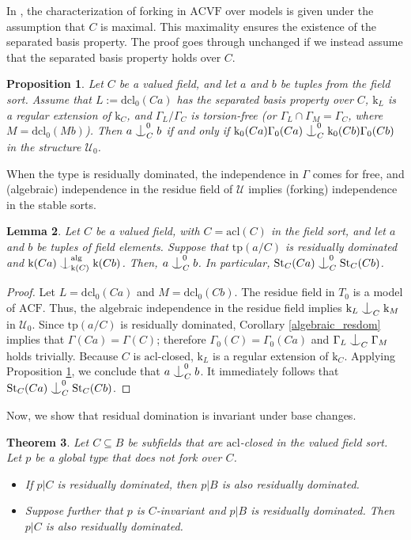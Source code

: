 \documentclass[12pt]{article}
\newcommand{\tpp}{\mathrm{tp}}
\newcommand{\ACVF}{\mathrm{ACVF}}
\newcommand{\ACF}{\mathrm{ACF}}
\newcommand{\acl}{\mathrm{acl}}
\newcommand{\dcl}{\mathrm{dcl}}
\newcommand{\alg}{\mathrm{alg}}
\newcommand{\st}{\mathrm{St}}
\newcommand{\0}{\emptyset}
\newcommand{\rf}{\mathrm{k}}
\newcommand{\U}{\mathcal{U}}
\newcommand{\Ualg}{\mathcal{U}_0}
\def\forkindep{\mathrel{\raise0.2ex\hbox{\ooalign{\hidewidth$\vert$\hidewidth\cr\raise-0.9ex\hbox{$\smile$}}}}}
\theoremstyle{plain}%
\newtheorem{thm}{Theorem}[section]
\newtheorem{lem}[thm]{Lemma}
\newtheorem{prop}[thm]{Proposition}
\theoremstyle{definition}
\theoremstyle{remark}
\begin{document}
In \cite[Theorem 3.14]{EHM19}, the characterization of forking in $\ACVF$ over models is given under the assumption that $C$ is maximal. This maximality ensures the existence of the separated basis property. The proof goes through unchanged if we instead assume that the separated basis property holds over $C$.


\begin{prop}\label{forkindep_acvf} Let $C$ be a valued field, and let $a$ and $b$ be tuples from the field sort. Assume that $L := \dcl_0(Ca)$ has the separated basis property over $C$, $\rf_{L}$ is a regular extension of $\rf_C$, and $\Gamma_L/\Gamma_C$ is torsion-free (or $\Gamma_L\cap \Gamma_M=\Gamma_C$, where $M=\dcl_0(Mb)$). Then $a \forkindep^{0}_C b$ if and only if $\rf_0(Ca)\Gamma_0(Ca) \forkindep^{0}_C \rf_0(Cb)\Gamma_0(Cb)$ in the structure $\Ualg$.
    \end{prop}


When the type is residually dominated, the independence in $\Gamma$ comes for free, and (algebraic) independence in the residue field of $\U$ implies (forking) independence in the stable sorts.

\begin{lem}\label{independence_in_rf_implies_independence_in_st}
  Let $C$ be a valued field, with $C=\acl(C)$ in the field sort, and let $a$ and $b$ be tuples of field elements. Suppose that $\tpp(a/C)$ is residually dominated and $\rf(Ca) \forkindep_{\rf(C)}^{\alg} \rf(Cb)$. Then, $a \forkindep^{0}_C b$. In particular, $\st_C(Ca) \forkindep^{0}_C \st_C(Cb)$.
\end{lem}
\begin{proof}
Let $L=\dcl_0(Ca)$ and $M=\dcl_0(Cb)$. 
The residue field in $T_0$ is a model of $\ACF$. Thus, the algebraic independence in the residue field implies $\rf_L \forkindep_{C} \rf_M$ in $\Ualg$.  Since $\tpp(a/C)$ is residually dominated, Corollary \ref{algebraic_resdom} implies that $\Gamma(Ca) = \Gamma(C)$; therefore $\Gamma_0(C) = \Gamma_0(Ca)$ and $\Gamma_L \forkindep_C \Gamma_M$ holds trivially. Because $C$ is $\acl$-closed, $\rf_L$ is a regular extension of $\rf_C$. Applying Proposition \ref{forkindep_acvf}, we conclude that $a \forkindep^{0}_C b$. It immediately follows that $\st_C(Ca) \forkindep^{0}_C \st_C(Cb)$.\end{proof}

Now, we show that residual domination is invariant under base changes. 

\begin{thm}\label{change_of_base}
Let $C \subseteq B$ be subfields that are $\acl$-closed in the valued field sort. Let $p$ be a global type that does not fork over $C$.
\begin{itemize}
    \item[(i)] If $p|C$ is residually dominated, then $p|B$ is also residually dominated.
    \item[(ii)] Suppose further that $p$ is $C$-invariant and $p|B$ is residually dominated. Then $p|C$ is also residually dominated.
\end{itemize}
\end{thm}
\end{document}
